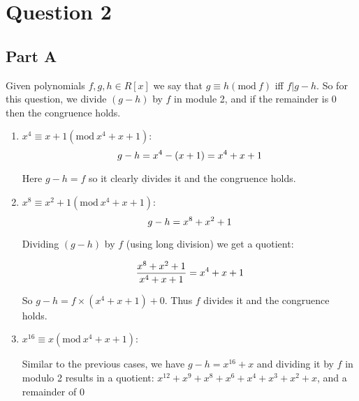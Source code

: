 \documentclass{article}
\numberwithin{equation}{subsection}
\begin{document}
	\section*{Question 2}
	\subsection*{Part A}	
	Given polynomials $f,g,h \in R[x]$ we say that $g\equiv h(\textrm{mod}\ f)$ iff $f|g-h$. So for this question, we divide $(g-h)$ by
	$f$ in module 2, and if the remainder is $0$ then the congruence holds.

	\vspace{10pt}
	\begin{enumerate}
		\item $x^4 \equiv x+1 (\textrm{mod}\ x^4+x+1)$:
				\begin{equation}\notag
					g - h = x^4 - (x+1) = x^4+x+1			
				\end{equation}
	
			\begin{adjustwidth}{1em}{1em}
			Here $g-h = f$ so it clearly divides it and the congruence holds.
				
			\end{adjustwidth}

			\vspace{15pt}
		\item $x^8 \equiv x^2 +1 (\textrm{mod}\ x^4+x+1)$:
				\begin{equation}\notag
					g - h = x^8 + x^2 + 1				
				\end{equation}
				\begin{adjustwidth}{1em}{1em}
					Dividing $(g-h)$ by $f$ (using long division) we get a quotient:
				\end{adjustwidth}
				\begin{equation}\notag
					\frac{x^8+x^2+1}{x^4+x+1} = x^4 + x + 1			
				\end{equation}
			
				\begin{adjustwidth}{1em}{1em}
					So $g-h= f\times(x^4+x+1) + 0$. Thus $f$ divides it and the congruence holds.	
				\end{adjustwidth}

			\vspace{15pt}
		\item $x^{16} \equiv x(\textrm{mod}\ x^4+x+1)$:
			\begin{adjustwidth}{1em}{1em}
				Similar to the previous cases, we have $g-h = x^{16}+x$ and dividing it by $f$ in modulo 2 results in 
				a quotient: $x^{12}+x^9+x^8+x^6+x^4+x^3+x^2+x$, and a remainder of $0$
			\end{adjustwidth}
	\end{enumerate}
\end{document}
